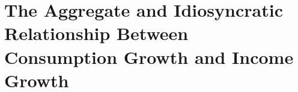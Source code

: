 \documentclass[BufferStockTheory]{subfiles}
\begin{document}
\begin{comment}
\hypertarget{dcgdxneg}{}
\subsection{Is Expected Consumption Growth a Declining Function of $\mRat_{t}$?}
\label{subsec:dcgdxneg}

Figure~\ref{fig:cGroTargetFig} depicts the expected consumption growth factor as a strictly
declining function of the cash-on-hand ratio. To investigate this,
define
\begin{align*}
  \pmb{\Upsilon}(\mRat_{t})  & \equiv  \PGro_{t+1} \usual{\cFunc}(\Rnorm_{t+1}\aFunc(\mRat_{t})+\tShkAll_{t+1})/\usual{\cFunc}(\mRat_{t})  = \cLevBF_{t+1}/\cLevBF_{t}
\end{align*}
and the proposition in which we are interested is
\begin{align*}
  (d/d\mRat_{t})\Ex_{t}[\underbrace{\pmb{\Upsilon}(\mRat_{t})}_{\equiv \pmb{\Upsilon}_{t+1}}]  & < 0
\end{align*}
or differentiating through the expectations operator, what we want is
\begin{align}
  \Ex_{t}\left[\PGro_{t+1} \left(\frac{\usual{\cFunc}^{\prime}(\mRat_{t+1})\Rnorm_{t+1}\aFunc^{\prime}(\mRat_{t})\usual{\cFunc}(\mRat_{t})-\usual{\cFunc}(\mRat_{t+1})\usual{\cFunc}^{\prime}(\mRat_{t})}{\usual{\cFunc}(\mRat_{t})^{2}}\right)\right]  & < 0 \label{eq:kappaPrimeLT0}.
\end{align}

Appendix~\ref{sec:ApndxCGrowthDeclines} shows that the proposition holds true if there are only transitory (and no permanent) shocks.  The software archive associated with this paper contains an example in which exotic interactions between permanent shocks and extreme curvature that occurs with very small $\pZero$ generate a (small) region where the proposition does not hold.  In practice, for plausible parametric choices (and in models without an artificial liquidity constraint), $\Ex_{t}[\pmb{\Upsilon}_{t+1}^{\prime}]<0$ should generally hold.

\end{comment}

\hypertarget{The-Aggregate-and-Idiosyncratic-Relationship-Between-Consumption-Growth-and-Income-Growth}{}
\section{The Aggregate and Idiosyncratic Relationship Between
  Consumption Growth and Income Growth}
\end{document}
